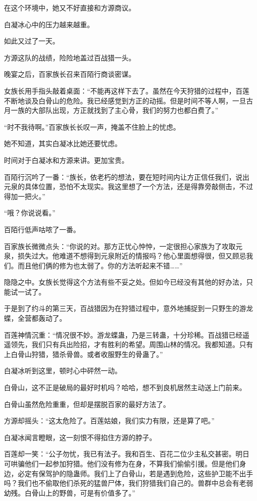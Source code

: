\begin{this_body}
在这个环境中，她又不好直接和方源商议。

白凝冰心中的压力越来越重。

如此又过了一天。

方源这队的战绩，险险地盖过百战猎一头。

晚宴之后，百家族长召来百陌行商谈密谋。

女族长用手指头敲着桌面：“不能再这样下去了。虽然在今天狩猎的过程中，百莲不断地谈及白骨山的危险。我已经感觉到方正的动摇。但是时间不等人啊，一旦古月一族的大部队出现，方正就找到了主心骨，我们的努力也都白费了。”

“时不我待啊。”百家族长长叹一声，掩盖不住脸上的忧虑。

她不知道，其实白凝冰比她还要忧虑。

时间对于白凝冰和方源来讲。更加宝贵。

百陌行沉吟了一番：“族长，依老朽的想法，要在短时间内让方正信任我们，说出元泉的具体位置，恐怕不太现实。我这里想了一个方法，还是得靠旁敲侧击，不过得加一把火。”

“哦？你说说看。”

百陌行低声咕哝了一番。

百家族长微微点头：“你说的对。那方正忧心忡忡，一定很担心家族为了攻取元泉，损失过大。他难道不想得到元泉附近的情报吗？他心里面想得很，但又顾忌我们。而且他们俩的修为也太弱了。你的方法听起来不错……”

隐隐之中。女族长觉得这个方法有些不妥之处。但如今已经没有其他的好办法，只能试一试了。

于是到了约斗的第三天，百战猎因为在狩猎过程中，意外地捕捉到一只野生的游龙蝶，全营都轰动了。

百莲神情沉重：“情况很不妙。游龙蝶蛊，乃是三转蛊，十分珍稀。百战猎已经遥遥领先，我们只有兵出险招，才有胜利的希望。周围山林的情况。我都知道。只有上白骨山狩猎，猎杀骨兽。或者收服野生的骨蛊了。”

白凝冰听到这里，顿时心中砰然一动。

白骨山，这不正是破局的最好时机吗？哈哈，想不到良机居然主动送上门前来。

白骨山虽然危险重重，但却是摆脱百家的最好方法了。

方源却摇头：“这太危险了。百莲姑娘，我们实力有限，还是算了吧。”

白凝冰闻言瞪眼，这一刻恨不得掐住方源的脖子。

百莲却一笑：“公子勿忧，我已有法子。我和百生、百花二位少主私交甚密。明日可哄骗他们一起参加狩猎。他们没有修为在身，不算我们偷偷引援。但是他们身边，必定有保驾护的隐蛊师。我们上了白骨山，若是遇到危险，这些护卫能不出手吗？我们也不偷取他们杀死的猛兽尸体，我们狩猎我们自己的。兽群中总会有老弱幼残。白骨山上的野兽，可是有价值多了。”


\end{this_body}
